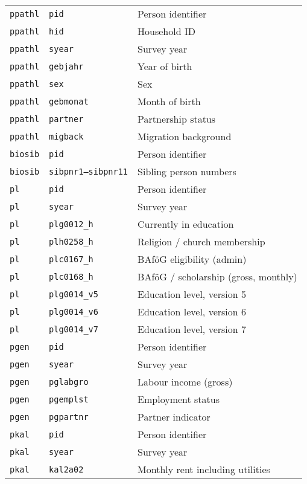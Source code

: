\begin{longtable}{lll}
\texttt{ppathl} & \texttt{pid} & Person identifier \\
\texttt{ppathl} & \texttt{hid} & Household ID \\
\texttt{ppathl} & \texttt{syear} & Survey year \\
\texttt{ppathl} & \texttt{gebjahr} & Year of birth \\
\texttt{ppathl} & \texttt{sex} & Sex \\
\texttt{ppathl} & \texttt{gebmonat} & Month of birth \\
\texttt{ppathl} & \texttt{partner} & Partnership status \\
\texttt{ppathl} & \texttt{migback} & Migration background \\
\texttt{biosib} & \texttt{pid} & Person identifier \\
\texttt{biosib} & \texttt{sibpnr1--sibpnr11} & Sibling person numbers \\
\texttt{pl} & \texttt{pid} & Person identifier \\
\texttt{pl} & \texttt{syear} & Survey year \\
\texttt{pl} & \texttt{plg0012\_h} & Currently in education \\
\texttt{pl} & \texttt{plh0258\_h} & Religion / church membership \\
\texttt{pl} & \texttt{plc0167\_h} & BAföG eligibility (admin) \\
\texttt{pl} & \texttt{plc0168\_h} & BAföG / scholarship (gross, monthly) \\
\texttt{pl} & \texttt{plg0014\_v5} & Education level, version 5 \\
\texttt{pl} & \texttt{plg0014\_v6} & Education level, version 6 \\
\texttt{pl} & \texttt{plg0014\_v7} & Education level, version 7 \\
\texttt{pgen} & \texttt{pid} & Person identifier \\
\texttt{pgen} & \texttt{syear} & Survey year \\
\texttt{pgen} & \texttt{pglabgro} & Labour income (gross) \\
\texttt{pgen} & \texttt{pgemplst} & Employment status \\
\texttt{pgen} & \texttt{pgpartnr} & Partner indicator \\
\texttt{pkal} & \texttt{pid} & Person identifier \\
\texttt{pkal} & \texttt{syear} & Survey year \\
\texttt{pkal} & \texttt{kal2a02} & Monthly rent including utilities \\

\end{longtable}
